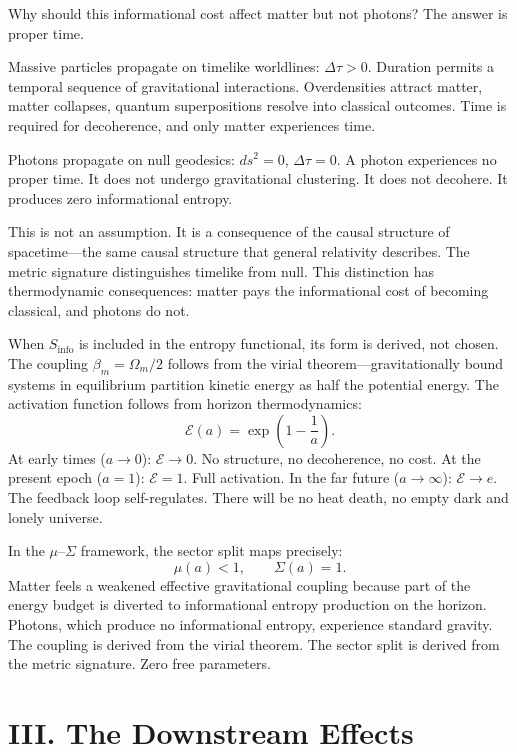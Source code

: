 \documentclass[12pt]{article}
\begin{document}
Why should this informational cost affect matter but not photons?  The
answer is proper time.

Massive particles propagate on timelike worldlines: $\Delta\tau > 0$.
Duration permits a temporal sequence of gravitational interactions.
Overdensities attract matter, matter collapses, quantum superpositions
resolve into classical outcomes.  Time is required for decoherence, and
only matter experiences time.

Photons propagate on null geodesics: $ds^2 = 0$, $\Delta\tau = 0$.  A
photon experiences no proper time.  It does not undergo gravitational
clustering.  It does not decohere.  It produces zero informational entropy.

This is not an assumption.  It is a consequence of the causal structure of
spacetime---the same causal structure that general relativity describes.
The metric signature distinguishes timelike from null.  This distinction
has thermodynamic consequences: matter pays the informational cost of
becoming classical, and photons do not.

When $S_{\mathrm{info}}$ is included in the entropy functional, its form
is derived, not chosen.  The coupling $\beta_m = \Omega_m/2$ follows from
the virial theorem---gravitationally bound systems in equilibrium partition
kinetic energy as half the potential energy.  The activation function
follows from horizon thermodynamics:
\begin{equation}
\mathcal{E}(a) = \exp\!\left(1 - \frac{1}{a}\right).
\end{equation}
At early times ($a \to 0$): $\mathcal{E} \to 0$.  No structure, no
decoherence, no cost.  At the present epoch ($a = 1$):
$\mathcal{E} = 1$.  Full activation.  In the far future
($a \to \infty$): $\mathcal{E} \to e$.  The feedback loop
self-regulates.  There will be no heat death, no empty dark and lonely
universe.

In the $\mu$--$\Sigma$ framework, the sector split maps precisely:
\begin{equation}
\mu(a) < 1, \qquad \Sigma(a) = 1.
\end{equation}
Matter feels a weakened effective gravitational coupling because part of the
energy budget is diverted to informational entropy production on the
horizon.  Photons, which produce no informational entropy, experience
standard gravity.  The coupling is derived from the virial theorem.  The
sector split is derived from the metric signature.  Zero free parameters.


\section*{III. The Downstream Effects}
\end{document}
